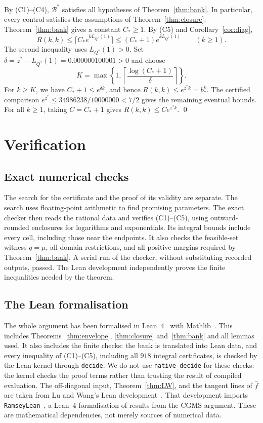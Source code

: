 \documentclass[11pt]{article}
\theoremstyle{definition}
\theoremstyle{remark}
\newcommand{\fh}{\widehat f}
\begin{document}
By (C1)--(C4), $\mathcal B^*$ satisfies all hypotheses of Theorem~\ref{thm:bank}.
In particular, every control satisfies the assumptions of Theorem~\ref{thm:closure}.
Theorem~\ref{thm:bank} gives a constant $C_*\ge1$.
By (C5) and Corollary~\ref{cor:diag},
\[
R(k,k)\le\big\lceil C_*e^{kL_{Q^*}(1)}\big\rceil
\le(C_*+1)e^{kL_{Q^*}(1)}\qquad(k\ge1).
\]
The second inequality uses $L_{Q^*}(1)>0$.
Set $\delta=z^*-L_{Q^*}(1)=0.000000100001>0$ and choose
\[
K=\max\left\{1,\left\lceil\frac{\log(C_*+1)}{\delta}\right\rceil\right\}.
\]
For $k\ge K$, we have $C_*+1\le e^{\delta k}$, and hence $R(k,k)\le e^{z^*k}=b_*^k$.
The certified comparison $e^{z^*}\le34986238/10000000<7/2$ gives the remaining eventual bounds.
For all $k\ge1$, taking $C=C_*+1$ gives $R(k,k)\le C e^{z^*k}$. \qed

\section{Verification}\label{sec:verification}

\subsection{Exact numerical checks}

The search for the certificate and the proof of its validity are separate.
The search uses floating-point arithmetic to find promising parameters.
The exact checker then reads the rational data and verifies (C1)--(C5), using outward-rounded enclosures
for logarithms and exponentials. Its integral bounds include every cell, including those near the endpoints.
It also checks the feasible-set witness $q=\mu$, all domain restrictions, and all positive margins required
by Theorem~\ref{thm:bank}. A serial run of the checker, without substituting recorded outputs, passed.
The Lean development independently proves the finite inequalities needed by the theorem.

\subsection{The Lean formalisation}

The whole argument has been formalised in Lean~4~\cite{Lean4} with Mathlib~\cite{Mathlib}.
This includes Theorems~\ref{thm:envelope},
\ref{thm:closure} and~\ref{thm:bank} and all lemmas used. It also includes the finite checks: the bank is translated
into Lean data, and every inequality of (C1)--(C5), including all $918$ integral certificates, is checked by the Lean
kernel through \texttt{decide}. We do not use \texttt{native\_decide} for these checks:
the kernel checks the proof terms rather than trusting the result of compiled evaluation.
The off-diagonal input, Theorem~\ref{thm:LW}, and the tangent lines of $\fh$ are taken from
Lu and Wang's Lean development~\cite{LWcode}. That development imports
\texttt{RamseyLean}~\cite{RamseyLean}, a Lean~4 formalisation of results from the CGMS argument.
These are mathematical dependencies, not merely sources of numerical data.
\end{document}
